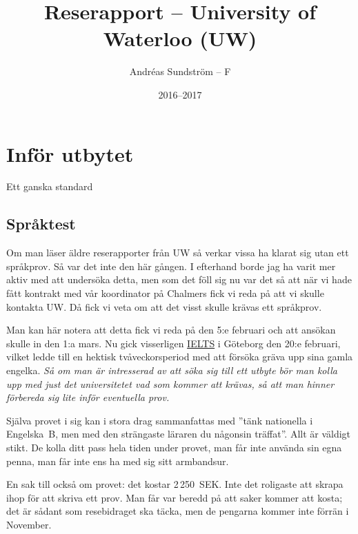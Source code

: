 \documentclass[11pt,a4paper, english, swedish]{article}
\begin{document}
\title{Reserapport -- University of Waterloo (UW)}
\author{Andréas Sundström -- F}
\date{2016--2017}

\maketitle

\addtocounter{section}{-1}
\section{Inför utbytet}
Ett ganska standard 

\subsection{Språktest}
Om man läser äldre reserapporter från UW så verkar vissa ha klarat sig
utan ett språkprov. Så var det inte den här gången. I efterhand borde
jag ha varit mer aktiv med att undersöka detta, men som det föll sig
nu var det så att när vi hade fått kontrakt med vår koordinator på
Chalmers fick vi reda på att vi skulle kontakta UW\footnotemark{}.
Då fick vi veta om att det visst skulle krävas ett språkprov. 

Man kan här notera att detta fick vi reda på den 5:e februari och att
ansökan skulle in den 1:a mars. Nu gick visserligen
\href{http://www.folkuniversitetet.se/Las-mer-om-sprak/Sprakexamina/IELTS/IELTS-Goteborg/}{IELTS}
i Göteborg den 20:e februari, vilket ledde till en hektisk
tvåveckorsperiod med att försöka gräva upp sina gamla
engelka. \emph{Så om man är intresserad av att söka sig till ett
  utbyte bör man kolla upp med just det universitetet vad som kommer
  att krävas, så att man hinner förbereda sig lite inför eventuella
  prov.}

Själva provet i sig kan i stora drag sammanfattas med ''tänk
nationella i Engelska~B, men med den strängaste läraren du någonsin
träffat''. Allt är väldigt stikt. De kolla ditt pass hela tiden
under provet, man får inte använda sin egna penna, man får inte ens ha
med sig sitt armbandsur. 

En sak till också om provet: det kostar 2\,250~SEK. Inte det roligaste
att skrapa ihop för att skriva ett prov. Man får var beredd på att saker
kommer att kosta; det är sådant som resebidraget ska täcka, men de
pengarna kommer inte förrän i November.
\end{document}
